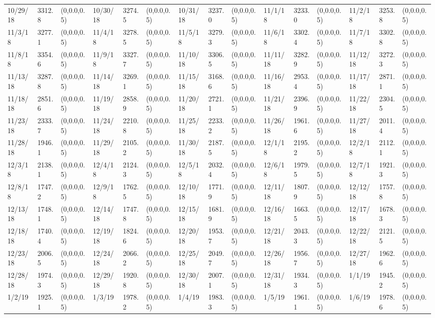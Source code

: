 \documentclass[12pt]{article}
\begin{document}
\begin{table}
\begin{center}
\begin{tabular}{p{15pt}p{15pt}p{25pt}p{15pt}p{15pt}p{25pt}p{15pt}p{15pt}p{25pt}p{15pt}p{15pt}p{25pt}p{15pt}p{15pt}p{25pt}}
        10/29/18&3312.8&(0,0.0,0.5)&10/30/18&3274.5&(0,0.0,0.5)&10/31/18&3237.0&(0,0.0,0.5)&11/1/18&3233.0&(0,0.0,0.5)&11/2/18&3253.8&(0,0.0,0.5)\\
        11/3/18&3277.1&(0,0.0,0.5)&11/4/18&3278.5&(0,0.0,0.5)&11/5/18&3279.3&(0,0.0,0.5)&11/6/18&3302.4&(0,0.0,0.5)&11/7/18&3302.8&(0,0.0,0.5)\\
        11/8/18&3354.6&(0,0.0,0.5)&11/9/18&3327.7&(0,0.0,0.5)&11/10/18&3306.5&(0,0.0,0.5)&11/11/18&3282.9&(0,0.0,0.5)&11/12/18&3272.3&(0,0.0,0.5)\\
        11/13/18&3287.8&(0,0.0,0.5)&11/14/18&3269.1&(0,0.0,0.5)&11/15/18&3168.6&(0,0.0,0.5)&11/16/18&2953.4&(0,0.0,0.5)&11/17/18&2871.1&(0,0.0,0.5)\\
        11/18/18&2851.6&(0,0.0,0.5)&11/19/18&2858.9&(0,0.0,0.5)&11/20/18&2721.1&(0,0.0,0.5)&11/21/18&2396.9&(0,0.0,0.5)&11/22/18&2304.5&(0,0.0,0.5)\\
        11/23/18&2333.7&(0,0.0,0.5)&11/24/18&2210.8&(0,0.0,0.5)&11/25/18&2233.2&(0,0.0,0.5)&11/26/18&1961.6&(0,0.0,0.5)&11/27/18&2011.4&(0,0.0,0.5)\\
        11/28/18&1946.1&(0,0.0,0.5)&11/29/18&2105.2&(0,0.0,0.5)&11/30/18&2187.5&(0,0.0,0.5)&12/1/18&2195.2&(0,0.0,0.5)&12/2/18&2112.1&(0,0.0,0.5)\\
        12/3/18&2138.1&(0,0.0,0.5)&12/4/18&2124.3&(0,0.0,0.5)&12/5/18&2032.4&(0,0.0,0.5)&12/6/18&1979.5&(0,0.0,0.5)&12/7/18&1921.3&(0,0.0,0.5)\\
        12/8/18&1747.2&(0,0.0,0.5)&12/9/18&1762.5&(0,0.0,0.5)&12/10/18&1771.9&(0,0.0,0.5)&12/11/18&1807.9&(0,0.0,0.5)&12/12/18&1757.8&(0,0.0,0.5)\\
        12/13/18&1748.1&(0,0.0,0.5)&12/14/18&1747.8&(0,0.0,0.5)&12/15/18&1681.9&(0,0.0,0.5)&12/16/18&1663.5&(0,0.0,0.5)&12/17/18&1678.3&(0,0.0,0.5)\\
        12/18/18&1740.4&(0,0.0,0.5)&12/19/18&1824.6&(0,0.0,0.5)&12/20/18&1953.7&(0,0.0,0.5)&12/21/18&2043.3&(0,0.0,0.5)&12/22/18&2121.5&(0,0.0,0.5)\\
        12/23/18&2006.5&(0,0.0,0.5)&12/24/18&2066.2&(0,0.0,0.5)&12/25/18&2049.7&(0,0.0,0.5)&12/26/18&1956.7&(0,0.0,0.5)&12/27/18&1962.6&(0,0.0,0.5)\\
        12/28/18&1974.3&(0,0.0,0.5)&12/29/18&1920.8&(0,0.0,0.5)&12/30/18&2007.1&(0,0.0,0.5)&12/31/18&1934.3&(0,0.0,0.5)&1/1/19&1945.2&(0,0.0,0.5)\\
        1/2/19&1925.1&(0,0.0,0.5)&1/3/19&1978.2&(0,0.0,0.5)&1/4/19&1983.3&(0,0.0,0.5)&1/5/19&1961.1&(0,0.0,0.5)&1/6/19&1978.6&(0,0.0,0.5)\\

\end{tabular}
\end{center}
\end{table}
\end{document}
